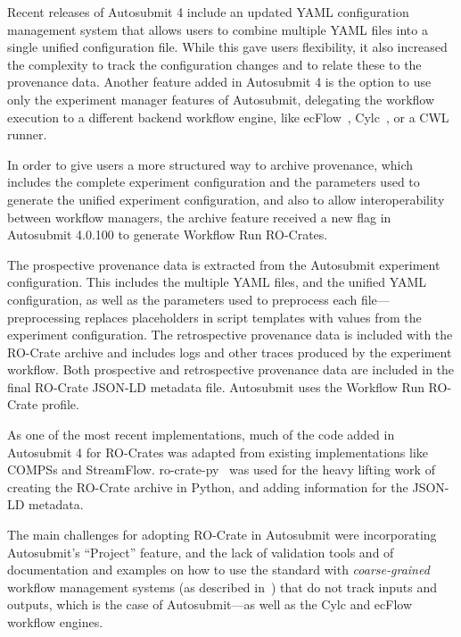 Recent releases of Autosubmit 4 include an updated \acrshort{YAML} configuration management system that allows users to combine multiple YAML files into a single unified configuration file.
While this gave users flexibility, it also increased the complexity to track the configuration changes and to relate these to the provenance data.
Another feature added in Autosubmit 4 is the option to use only the experiment manager features of Autosubmit, delegating the workflow execution to a different backend workflow engine, like ecFlow~\cite{Bahra 2011}, Cylc~\cite{Oliver 2019}, or a CWL runner.

In order to give users a more structured way to archive provenance, which includes the complete experiment configuration and the parameters used to generate the unified experiment configuration, and also to allow interoperability between workflow managers, the archive feature received a new flag in Autosubmit 4.0.100 \cite{Beltrán 2023} to generate Workflow Run RO-Crates.

The prospective provenance data is extracted from the Autosubmit experiment configuration.
This includes the multiple YAML files, and the unified YAML configuration, as well as the parameters used to preprocess each file---preprocessing replaces placeholders in script templates with values from the experiment configuration.
The retrospective provenance data is included with the RO-Crate archive and includes logs and other traces produced by the experiment workflow.
Both prospective and retrospective provenance data are included in the final RO-Crate JSON-LD metadata file. Autosubmit uses the Workflow Run RO-Crate profile.

As one of the most recent implementations, much of the code added in Autosubmit 4 for RO-Crates was adapted from existing implementations like COMPSs and StreamFlow.
ro-crate-py~\cite{De Geest 2023a} was used for the heavy lifting work of creating the RO-Crate archive in Python, and adding information for the JSON-LD metadata.

The main challenges for adopting RO-Crate in Autosubmit were incorporating Autosubmit's ``Project'' feature, and the lack of validation tools and of documentation and examples on how to use the standard with \emph{coarse-grained} workflow management systems (as described in~\cite{Goble 2020}) that do not track inputs and outputs, which is the case of Autosubmit---as well as the Cylc and ecFlow workflow engines.

